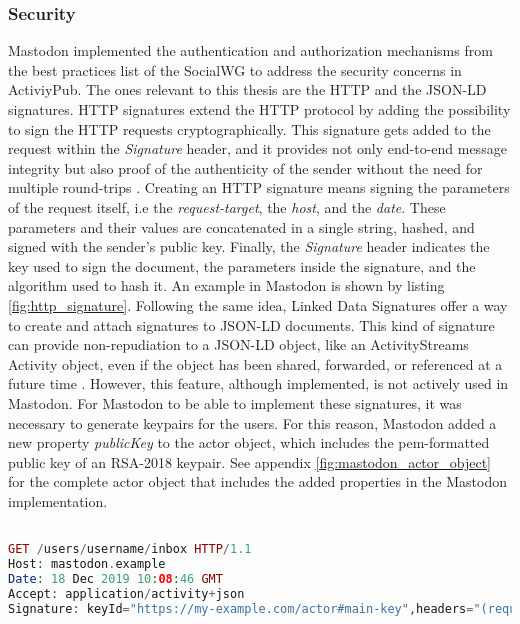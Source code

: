 \subsubsection*{\textbf{Security}}
Mastodon implemented the authentication and authorization mechanisms from the best practices list of the SocialWG to address the security concerns in ActiviyPub. The ones relevant to this thesis are the HTTP and the JSON-LD signatures. HTTP signatures extend the HTTP protocol by adding the possibility to sign the HTTP requests cryptographically. This signature gets added to the request within the \emph{Signature} header, and it provides not only end-to-end message integrity but also proof of the authenticity of the sender without the need for multiple round-trips \cite{cavage_sporny_2019}. Creating an HTTP signature means signing the parameters of the request itself, i.e the \emph{request-target}, the \emph{host}, and the \emph{date}. These parameters and their values are concatenated in a single string, hashed, and signed with the sender's public key. Finally, the \emph{Signature} header indicates the key used to sign the document, the parameters inside the signature, and the algorithm used to hash it. An example in Mastodon is shown by listing \ref{fig:http_signature}. 
Following the same idea, Linked Data Signatures offer a way to create and attach signatures to JSON-LD documents. This kind of signature can provide non-repudiation to a JSON-LD object, like an ActivityStreams Activity object, even if the object has been shared, forwarded, or referenced at a future time \cite{celik_prodromou_le_hors_2014}. However, this feature, although implemented, is not actively used in Mastodon. For Mastodon to be able to implement these signatures, it was necessary to generate keypairs for the users. For this reason, Mastodon added a new property \emph{publicKey} to the actor object, which includes the pem-formatted public key of an RSA-2018 keypair. See appendix \ref{fig:mastodon_actor_object} for the complete actor object that includes the added properties in the Mastodon implementation.

\lstset{style=JSONStyle}
\begin{lstlisting}[language=PHP, caption=Signed HTTP Request, label=fig:http_signature, float=h]

GET /users/username/inbox HTTP/1.1
Host: mastodon.example
Date: 18 Dec 2019 10:08:46 GMT
Accept: application/activity+json
Signature: keyId="https://my-example.com/actor#main-key",headers="(request-target) host date",signature="Y2FiYW...IxNGRiZDk4ZA=="

\end{lstlisting}

